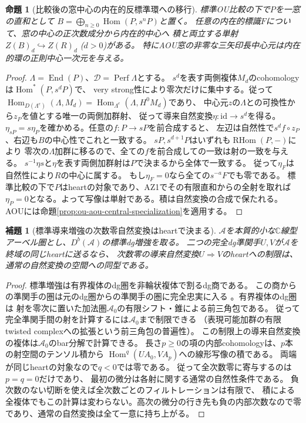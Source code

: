 \documentclass[11pt,a4paper]{ltjsarticle}
\newtheorem{proposition}[theorem]{命題}
\newtheorem{lemma}[theorem]{補題}
\theoremstyle{definition}
\newcommand{\Perf}{\operatorname{Perf}}
\begin{document}
\begin{proposition}[比較後の窓中心の内在的反標準環への移行]
\label{prop:ou-window-centre-transfer}
標準OU比較の下で$P$を一窓の直和として
$B=\bigoplus_{n\ge0}\operatorname{Hom}(P,s^nP)$と置く。
任意の内在的標識$F$について、窓の中心の正次数成分から内在的中心へ
積と両立する単射$Z(B)_d\hookrightarrow Z(R)_d$ ($d>0$)がある。
特にAOU窓の非零な三矢印長中心元は内在的環の正則中心一次元を与える。
\end{proposition}
\begin{proof}
$\Lambda=\operatorname{End}(P)$、$\mathcal D=\Perf\Lambda$とする。
$s^d$を表す両側複体$M_d$のcohomologyは$\operatorname{Hom}^*(P,s^dP)$で、
very strong性により零次だけに集中する。従って
$\operatorname{Hom}_{D(\Lambda^e)}(\Lambda,M_d)
=\operatorname{Hom}_{\Lambda^e}(\Lambda,H^0 M_d)$であり、
中心元$z$の$\Lambda$との可換性から$z_P$を値とする唯一の両側加群射、
従って導来自然変換$\eta:\mathrm{id}\to s^d$を得る。
$\eta_{sP}=s\eta_P$を確かめる。任意の$f:P\to sP$を前合成すると、
左辺は自然性で$s^d f\circ z_P$、右辺も$B$の中心性でこれと一致する。
$sP,s^{d+1}P$はいずれも$\operatorname{RHom}(P,-)$により
零次の$\Lambda$加群に移るので、全ての$f$を前合成しての一致は射の一致を与える。
$s^{-1}\eta s$と$\eta$を表す両側加群射は$P$で決まるから全体で一致する。
従って$\eta_F$は自然性により$R$の中心に属する。
もし$\eta_F=0$なら全ての$s^{-a}F$でも零である。
標準比較の下で$P$はheartの対象であり、AZ1でその有限直和からの全射を取れば
$\eta_P=0$となる。よって写像は単射である。積は自然変換の合成で保たれる。
AOUには命題\ref{prop:ou-aou-central-specialization}を適用する。
\end{proof}

\begin{lemma}[標準導来増強の次数零自然変換はheartで決まる]
\label{lem:ou-enhanced-heart-faithful}
$\mathcal A$を本質的小な$\mathbb C$線型アーベル圏とし、$D^b(\mathcal A)$の標準dg増強を取る。
二つの完全dg準関手$U,V$が$\mathcal A$を終域の同じheartに送るなら、
次数零の導来自然変換$U\Rightarrow V$のheartへの制限は、通常の自然変換の空間への同型である。
\end{lemma}
\begin{proof}
標準増強は有界複体のdg圏を非輪状複体で割るdg商である。
この商からの準関手の圏は元のdg圏からの準関手の圏に完全忠実に入る
\cite[Theorem~1.6.2(ii)]{Drinfeld2004}。有界複体のdg圏は
射を零次に置いた加法圏$\mathcal A_0$の有限シフト・錐による前三角包である。
従って完全準関手間の射を計算するには$\mathcal A_0$まで制限できる
（表現可能加群の有限twisted complexへの拡張という前三角包の普遍性）。
この制限上の導来自然変換の複体は$\mathcal A_0$のbar分解で計算できる。
長さ$p\ge0$の項の内部cohomologyは、$p$本の射空間のテンソル積から
$\operatorname{Hom}^{q}(U A_0,V A_p)$への線形写像の積である。
両端が同じheartの対象なので$q<0$では零である。
従って全次数零に寄与するのは$p=q=0$だけであり、
最初の微分は各射に関する通常の自然性条件である。
負次数のない切断を使えば全次数ごとのフィルトレーションは有限で、
積による全複体でもこの計算は変わらない。高次の微分の行き先も負の内部次数なので零であり、通常の自然変換は全て一意に持ち上がる。
\end{proof}
\end{document}
